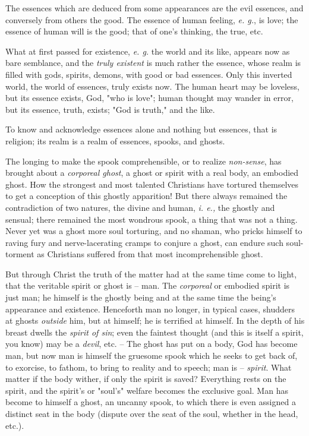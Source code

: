 The essences which are deduced from some appearances are the evil essences, 
and conversely from others the good. The essence of human feeling, \textit{e. 
g.}, is love; the essence of human will is the good; that of one's thinking, 
the true, etc.

What at first passed for existence, \textit{e. g.} the world and its like, 
appears now as bare semblance, and the \textit{truly existent} is much rather 
the essence, whose realm is filled with gods, spirits, demons, with good or 
bad essences. Only this inverted world, the world of essences, truly exists 
now. The human heart may be loveless, but its essence exists, God, "{}who is 
love"{}; human thought may wander in error, but its essence, truth, exists; 
"{}God is truth,"{} and the like.

To know and acknowledge essences alone and nothing but essences, that is 
religion; its realm is a realm of essences, spooks, and ghosts.

The longing to make the spook comprehensible, or to realize 
\textit{non-sense}, has brought about a \textit{corporeal ghost}, a ghost or 
spirit with a real body, an embodied ghost. How the strongest and most 
talented Christians have tortured themselves to get a conception of this 
ghostly apparition! But there always remained the contradiction of two 
natures, the divine and human, \textit{i. e.,} the ghostly and sensual; there 
remained the most wondrous spook, a thing that was not a thing. Never yet was 
a ghost more soul torturing, and no shaman, who pricks himself to raving fury 
and nerve-lacerating cramps to conjure a ghost, can endure such soul-torment 
as Christians suffered from that most incomprehensible ghost.

But through Christ the truth of the matter had at the same time come to light, 
that the veritable spirit or ghost is -- man. The \textit{corporeal} or 
embodied spirit is just man; he himself is the ghostly being and at the same 
time the being's appearance and existence. Henceforth man no longer, in 
typical cases, shudders at ghosts \textit{outside} him, but at himself; he is 
terrified at himself. In the depth of his breast dwells the \textit{spirit of 
sin}; even the faintest thought (and this is itself a spirit, you know) may be 
a \textit{devil}, etc. -- The ghost has put on a body, God has become man, but 
now man is himself the gruesome spook which he seeks to get back of, to 
exorcise, to fathom, to bring to reality and to speech; man is -- 
\textit{spirit}. What matter if the body wither, if only the spirit is saved? 
Everything rests on the spirit, and the spirit's or "{}soul's"{} welfare 
becomes the exclusive goal. Man has become to himself a ghost, an uncanny 
spook, to which there is even assigned a distinct seat in the body (dispute 
over the seat of the soul, whether in the head, etc.).

